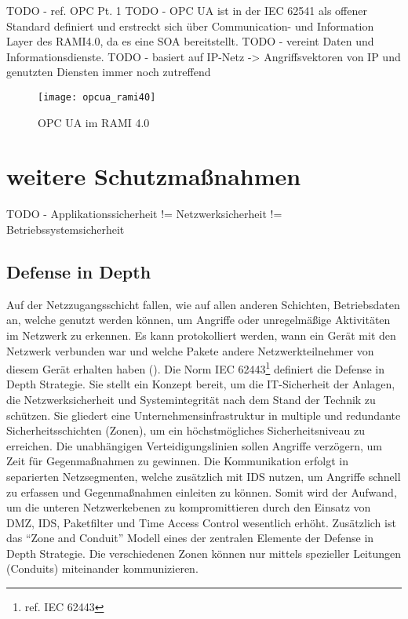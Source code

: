 TODO - ref. OPC Pt. 1
TODO - \ac{OPC UA} ist in der \ac{IEC} 62541 als offener Standard definiert und erstreckt sich über Communication- und Information Layer des \ac{RAMI4.0}, da es eine \ac{SOA} bereitstellt. 
TODO - vereint Daten und Informationsdienste. 
TODO - basiert auf IP-Netz -> Angriffsvektoren von IP und genutzten Diensten immer noch zutreffend

\begin{figure}[h]
    \centering
    \texttt{[image: opcua\_rami40]}
    \caption{OPC UA im RAMI 4.0}
    \label{Kap3:OPC UA im RAMI 4.0}
  \end{figure}
  
\clearpage

\section{weitere Schutzmaßnahmen}
TODO - Applikationssicherheit != Netzwerksicherheit != Betriebssystemsicherheit

\subsection{Defense in Depth}
Auf der Netzzugangsschicht fallen, wie auf allen anderen Schichten, Betriebsdaten an, welche genutzt werden können, um Angriffe oder unregelmäßige Aktivitäten im Netzwerk zu erkennen. Es kann protokolliert werden, wann ein Gerät mit den Netzwerk verbunden war und welche Pakete andere Netzwerkteilnehmer von diesem Gerät erhalten haben (\cite{sichKom2017}). Die Norm IEC 62443\footnote{ref. IEC 62443} definiert die Defense in Depth Strategie. Sie stellt ein Konzept bereit, um die IT-Sicherheit der Anlagen, die Netzwerksicherheit und Systemintegrität nach dem Stand der Technik zu schützen. Sie gliedert eine Unternehmensinfrastruktur in multiple und redundante Sicherheitsschichten (Zonen), um ein höchstmögliches Sicherheitsniveau zu erreichen. Die unabhängigen Verteidigungslinien sollen Angriffe verzögern, um Zeit für Gegenmaßnahmen zu gewinnen. Die Kommunikation erfolgt in separierten Netzsegmenten, welche zusätzlich mit \ac{IDS} nutzen, um Angriffe schnell zu erfassen und Gegenmaßnahmen einleiten zu können. Somit wird der Aufwand, um die unteren Netzwerkebenen zu kompromittieren durch den Einsatz von \ac{DMZ}, \ac{IDS}, Paketfilter und Time Access Control wesentlich erhöht. Zusätzlich ist das "`Zone and Conduit"' Modell eines der zentralen Elemente der Defense in Depth Strategie. Die verschiedenen Zonen können nur mittels spezieller Leitungen (Conduits) miteinander kommunizieren.  

